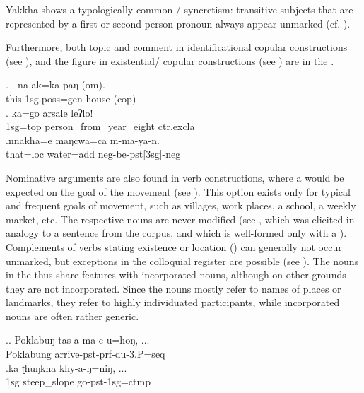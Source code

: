 Yakkha shows a typologically common / syncretism: transitive subjects that are represented by a first or second person pronoun always appear unmarked (cf. ).
	
\largerpage
Furthermore, both topic and comment in identificational copular constructions (see \Next), and  the figure in existential/ copular constructions (see \Next[c]) are in the .
	
\ex. \ag. na ak=ka paŋ (om).\\
		this {\sc 1sg.poss=gen} house ({\sc cop})\\
		\bg.   ka=go      arsale          leʔlo!\\
	{\sc 1sg=top} person\_from\_year\_eight {\sc ctr.excla}		\\
	 	
	\bg.nnakha=e    maŋcwa=ca        m-ma-ya-n.\\
	that{\sc =loc}  water{\sc =add} {\sc neg-}be{\sc -pst[3sg]-neg}\\
	
Nominative arguments are also found in  verb constructions, where a  would be expected on the goal of the movement (see \Next). This option exists only for typical and frequent goals of movement, such as villages, work places, a school, a weekly market, etc. The respective nouns are never modified (see \NNext[a], which was elicited in analogy to a sentence from the corpus, and which is well-formed only with a ). Complements of verbs stating existence or location () can generally not occur unmarked, but exceptions in the colloquial register are possible (see \NNext[b]). The nouns in the  thus share features with incorporated nouns, although on other grounds they are not incorporated. Since the nouns mostly refer to names of places or landmarks, they refer to highly individuated participants, while incorporated nouns are often rather generic. 

	
 	\ex.\ag. Poklabuŋ tas-a-ma-c-u=hoŋ, ...\\
	Poklabung{\sc [loc]} arrive{\sc -pst-prf-du-3.P=seq} 	\\
	 	
\bg.ka  ʈhuŋkha           khy-a-ŋ=niŋ, ...\\
{\sc 1sg} steep\_slope{\sc [loc]} go{\sc -pst-1sg=ctmp}\\

